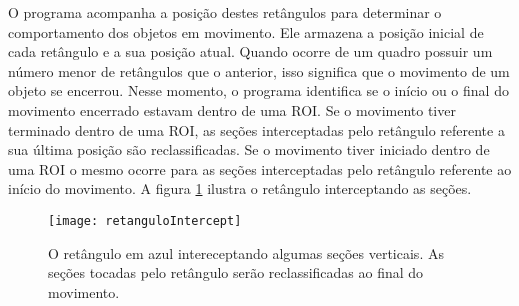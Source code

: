 O programa acompanha a posição destes retângulos para determinar o comportamento dos objetos em movimento. Ele armazena a posição inicial de cada retângulo e a sua posição atual. Quando ocorre de um quadro possuir um número menor de retângulos que o anterior, isso significa que o movimento de um objeto se encerrou. Nesse momento, o programa identifica se o início ou o final do movimento encerrado estavam dentro de uma ROI. Se o movimento tiver terminado dentro de uma ROI, as seções interceptadas pelo retângulo referente a sua última posição são reclassificadas. Se o movimento tiver iniciado dentro de uma ROI o mesmo ocorre para as seções interceptadas pelo retângulo referente ao início do movimento. A figura \ref{fig:movimentoIntercept} ilustra o retângulo interceptando as seções.

\begin{figure}
\centering
\texttt{[image: retanguloIntercept]}
\centering
\caption{O retângulo em azul intereceptando algumas seções verticais. As seções tocadas pelo retângulo serão reclassificadas ao final do movimento.}
\label{fig:movimentoIntercept}
\end{figure}





